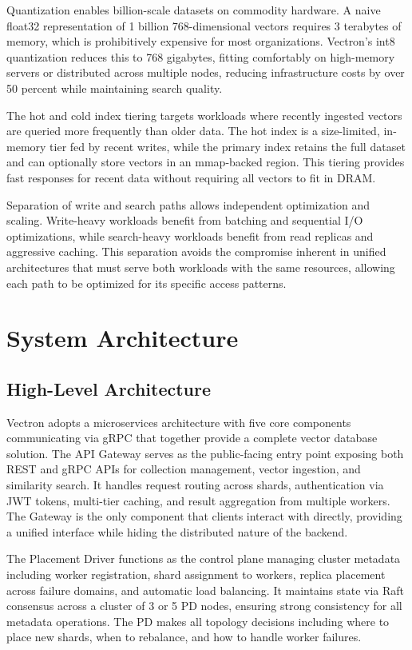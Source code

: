 \documentclass[conference]{IEEEtran}
\begin{document}
Quantization enables billion-scale datasets on commodity hardware. A naive float32 representation of 1 billion 768-dimensional vectors requires 3 terabytes of memory, which is prohibitively expensive for most organizations. Vectron's int8 quantization reduces this to 768 gigabytes, fitting comfortably on high-memory servers or distributed across multiple nodes, reducing infrastructure costs by over 50 percent while maintaining search quality.

The hot and cold index tiering targets workloads where recently ingested vectors are queried more frequently than older data. The hot index is a size-limited, in-memory tier fed by recent writes, while the primary index retains the full dataset and can optionally store vectors in an mmap-backed region. This tiering provides fast responses for recent data without requiring all vectors to fit in DRAM.

Separation of write and search paths allows independent optimization and scaling. Write-heavy workloads benefit from batching and sequential I/O optimizations, while search-heavy workloads benefit from read replicas and aggressive caching. This separation avoids the compromise inherent in unified architectures that must serve both workloads with the same resources, allowing each path to be optimized for its specific access patterns.

\section{System Architecture}

\subsection{High-Level Architecture}

Vectron adopts a microservices architecture with five core components communicating via gRPC \cite{grpc} that together provide a complete vector database solution. The API Gateway serves as the public-facing entry point exposing both REST and gRPC APIs for collection management, vector ingestion, and similarity search. It handles request routing across shards, authentication via JWT tokens, multi-tier caching, and result aggregation from multiple workers. The Gateway is the only component that clients interact with directly, providing a unified interface while hiding the distributed nature of the backend.

The Placement Driver functions as the control plane managing cluster metadata including worker registration, shard assignment to workers, replica placement across failure domains, and automatic load balancing. It maintains state via Raft consensus across a cluster of 3 or 5 PD nodes, ensuring strong consistency for all metadata operations. The PD makes all topology decisions including where to place new shards, when to rebalance, and how to handle worker failures.
\end{document}
